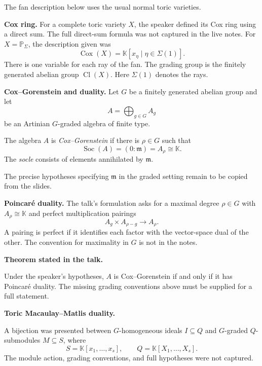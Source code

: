 The fan description below uses the
usual normal toric varieties.

\medskip\noindent
\textbf{Cox ring.}
For a complete toric variety $X$, the
speaker defined its Cox ring using a
direct sum. The full direct-sum formula
was not captured in the live notes.
For $X=\mathbb{P}_{\Sigma}$, the
description given was
$$
\operatorname{Cox}(X)
=\mathbb{K}[x_{\eta}\mid
\eta\in\Sigma(1)].
$$
There is one variable for each ray of
the fan. The grading group is the
finitely generated abelian group
$\operatorname{Cl}(X)$.
Here $\Sigma(1)$ denotes the rays.

\medskip\noindent
\textbf{Cox--Gorenstein and duality.}
Let $G$ be a finitely generated abelian
group and let
$$
A=\bigoplus_{g\in G}A_g
$$
be an Artinian $G$-graded algebra of
finite type.

\begin{definition}
\label{definition-session-cox-gorenstein}
The algebra $A$ is
\emph{Cox--Gorenstein} if there is
$\rho\in G$ such that
$$
\operatorname{Soc}(A)
=(0:\mathfrak{m})=A_{\rho}
\cong\mathbb{K}.
$$
The \emph{socle} consists of elements
annihilated by $\mathfrak{m}$.
\end{definition}

The precise hypotheses specifying
$\mathfrak{m}$ in the graded setting
remain to be copied from the slides.

\medskip\noindent
\textbf{Poincaré duality.}
The talk's formulation asks for a
maximal degree $\rho\in G$ with
$A_{\rho}\cong\mathbb{K}$ and perfect
multiplication pairings
$$
A_g\times A_{\rho-g}
\longrightarrow A_{\rho}.
$$
A pairing is perfect if it identifies
each factor with the vector-space
dual of the other.
The convention for maximality in $G$
is not in the notes.

\medskip\noindent
\textbf{Theorem stated in the talk.}
\par\nopagebreak\noindent
Under the speaker's hypotheses,
$A$ is Cox--Gorenstein if and only if
it has Poincaré duality.
The missing grading conventions above
must be supplied for a full statement.

\medskip\noindent
\textbf{Toric Macaulay--Matlis duality.}
\par\nopagebreak\noindent
A bijection was presented between
$G$-homogeneous ideals $I\subseteq Q$
and $G$-graded $Q$-submodules
$M\subseteq S$, where
$$
S=\mathbb{K}[x_1,\ldots,x_s],
\qquad
Q=\mathbb{K}[X_1,\ldots,X_s].
$$
The module action, grading conventions,
and full hypotheses were not captured.

